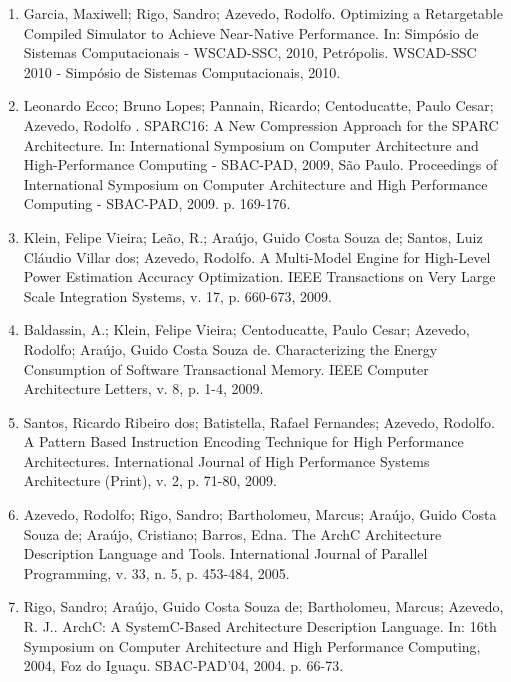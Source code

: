 \documentclass[11pt]{article}
\begin{document}
\begin{enumerate}


\item Garcia, Maxiwell; Rigo, Sandro; Azevedo, Rodolfo. Optimizing a
  Retargetable Compiled Simulator to Achieve Near-Native
  Performance. In: Simpósio de Sistemas Computacionais - WSCAD-SSC,
  2010, Petrópolis. WSCAD-SSC 2010 - Simpósio de Sistemas
  Computacionais, 2010.

\item Leonardo Ecco; Bruno Lopes; Pannain, Ricardo; Centoducatte,
  Paulo Cesar; Azevedo, Rodolfo . SPARC16: A New Compression Approach
  for the SPARC Architecture. In: International Symposium on Computer
  Architecture and High-Performance Computing - SBAC-PAD, 2009, São
  Paulo. Proceedings of International Symposium on Computer
  Architecture and High Performance Computing - SBAC-PAD,
  2009. p. 169-176.

\item Klein, Felipe Vieira; Leão, R.; Araújo, Guido Costa Souza de;
  Santos, Luiz Cláudio Villar dos; Azevedo, Rodolfo. A Multi-Model
  Engine for High-Level Power Estimation Accuracy Optimization. IEEE
  Transactions on Very Large Scale Integration Systems, v. 17,
  p. 660-673, 2009.
  
\item Baldassin, A.; Klein, Felipe Vieira; Centoducatte, Paulo Cesar;
  Azevedo, Rodolfo; Araújo, Guido Costa Souza de. Characterizing the
  Energy Consumption of Software Transactional Memory. IEEE Computer
  Architecture Letters, v. 8, p. 1-4, 2009.

\item Santos, Ricardo Ribeiro dos; Batistella, Rafael Fernandes;
  Azevedo, Rodolfo. A Pattern Based Instruction Encoding Technique for
  High Performance Architectures. International Journal of High
  Performance Systems Architecture (Print), v. 2, p. 71-80, 2009.

\item Azevedo, Rodolfo; Rigo, Sandro; Bartholomeu, Marcus; Araújo,
  Guido Costa Souza de; Araújo, Cristiano; Barros, Edna. The ArchC
  Architecture Description Language and Tools. International Journal
  of Parallel Programming, v. 33, n. 5, p. 453-484, 2005.

\item Rigo, Sandro; Araújo, Guido Costa Souza de; Bartholomeu, Marcus;
  Azevedo, R. J.. ArchC: A SystemC-Based Architecture Description
  Language. In: 16th Symposium on Computer Architecture and High
  Performance Computing, 2004, Foz do Iguaçu. SBAC-PAD'04,
  2004. p. 66-73.


\end{enumerate}
\end{document}
